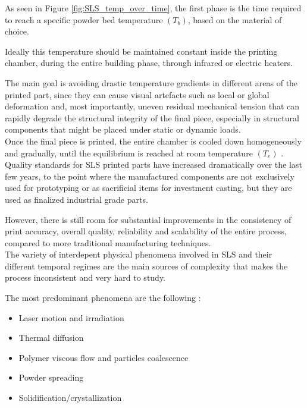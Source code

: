 \documentclass[a4paper]{article}
\begin{document}
    As seen in Figure \ref{fig:SLS_temp_over_time}, the first phase is the time required to reach a specific powder bed temperature $(T_b)$, based on the material of choice. 

    Ideally this temperature should be maintained constant inside the printing
    chamber, during the entire building phase, through infrared or electric heaters. 
    
    The main goal is avoiding drastic temperature gradients in different areas of the printed part, since they can cause 
    visual artefacts such as local or global deformation and, most importantly, uneven residual mechanical tension that can 
    rapidly degrade the structural integrity of the final piece, especially in structural components that might be placed under static or
    dynamic loads. \\ 
    
    Once the final piece is printed, the entire chamber is cooled down homogeneously and gradually, until the equilibrium is reached at room 
    temperature $(T_e)$ \autocite*{Padovano_SLS_Review}. \\ 

    Quality standards for SLS printed parts have increased dramatically over the last few years, to the point where 
    the manufactured components are not exclusively used for prototyping or as sacrificial items for investment casting, but they are 
    used as finalized industrial grade parts. 

    However, there is still room for substantial improvements in the consistency of print accuracy, overall quality, reliability 
    and scalability of the entire process, compared to more traditional manufacturing techniques. \\ 

    The variety of interdepent physical phenomena involved in SLS and their different temporal regimes are the main 
    sources of complexity that makes the process inconsistent and very hard to study. 

    The most predominant phenomena are the following \autocite*{Padovano_SLS_Review}: 

    \begin{itemize}
        \item Laser motion and irradiation
        \item Thermal diffusion
        \item Polymer viscous flow and particles coalescence 
        \item Powder spreading
        \item Solidification/crystallization 
    \end{itemize} 
    
\end{document}
